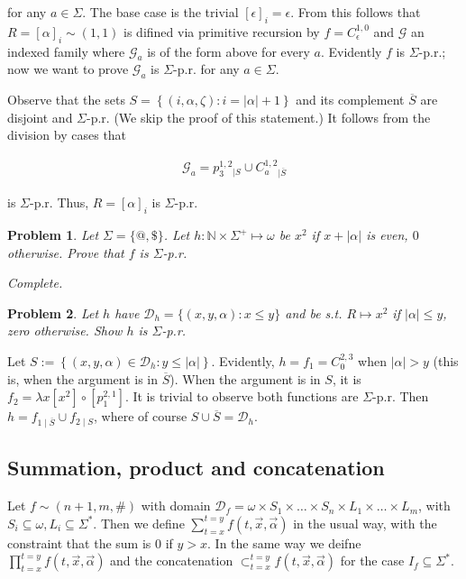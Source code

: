 \documentclass[a4paper, 12pt]{article}
\newtheorem{problem}{Problem}
\newtheorem{problem}{Problem}
\begin{document}
for any $a \in \Sigma$. The base case is the trivial $[\epsilon]_i = \epsilon$.
From this follows  that $R = [\alpha]_i \sim (1, 1)$ is difined via primitive recursion by
$f = C_{\epsilon}^{1, 0}$ and $\mathcal{G}$ an indexed family where
$\mathcal{G}_a$ is of the form above for every $a$. Evidently $f$ is
$\Sigma$-p.r.; now we want to prove $\mathcal{G}_a$ is $\Sigma$-p.r. for any $a
\in \Sigma$.


Observe that the sets $S = \left\{ (i, \alpha, \zeta) : i = |\alpha| + 1 \right\} $
and its complement $\overline{S}$ are disjoint and $\Sigma$-p.r. (We skip the
proof of this statement.) It follows from the division by cases that

\begin{align*}
    \mathcal{G}_a = p_3^{1, 2}_{\mid S} \cup C_{a}^{1, 2}_{\mid \overline{S}}
\end{align*}

is $\Sigma$-p.r. Thus, $R = [\alpha]_i$ is $\Sigma$-p.r.


\begin{problem}
    Let $\Sigma = \{@, \$\}$. Let $h : \mathbb{N} \times  \Sigma^{+} \mapsto \omega$
    be $x^2$ if $x + |\alpha|$ is even, $0$ otherwise. Prove that $f$ is
    $\Sigma$-p.r.
\end{problem}

\textit{Complete.}


\begin{problem}
    Let $h$ have $\mathcal{D}_{h} = \{(x, y, \alpha) : x \leq y\}$ and be s.t.
    $R \mapsto x^2$ if $|\alpha| \leq y$, zero otherwise. Show $h$ is $\Sigma$-p.r.
\end{problem}

Let $S := \left\{ (x, y, \alpha) \in \mathcal{D}_h : y \leq |\alpha| \right\}$.
Evidently, $h = f_1 = C_{0}^{2, 3}$ when $|\alpha| > y$ (this is, when the argument is
in $\overline{S}$). When the argument is in $S$, it is $f_2 = \lambda x[x^2] \circ
[p_1^{2, 1}]$. It is trivial to observe both functions are $\Sigma$-p.r. Then $h
= f_{1\mid \overline{S}} \cup f_{2\mid S}$, where of course $S \cup \overline{S}
= \mathcal{D}_h$.

\subsection{Summation, product and concatenation}

Let $f \sim (n + 1, m, \#)$ with domain $\mathcal{D}_f = \omega \times  S_1 \times \ldots
\times  S_n \times L_1 \times \ldots \times   L_m$, with $S_i \subseteq \omega, L_i \subseteq
\Sigma^{*}$. Then we define $\sum_{t =
x}^{t = y} f(t, \overrightarrow{x}, \overrightarrow{\alpha})$ in the usual way,
with the constraint that the sum is $0$ if $y > x$. In the same way we deifne
$\prod_{t = x}^{t = y} f(t, \overrightarrow{x}, \overrightarrow{\alpha})$ and
the concatenation $\mathop{\subset}_{t=x}^{t=y}f(t, \overrightarrow{x},
\overrightarrow{\alpha})$ for the case $I_f \subseteq \Sigma^{*}$.
\end{document}
